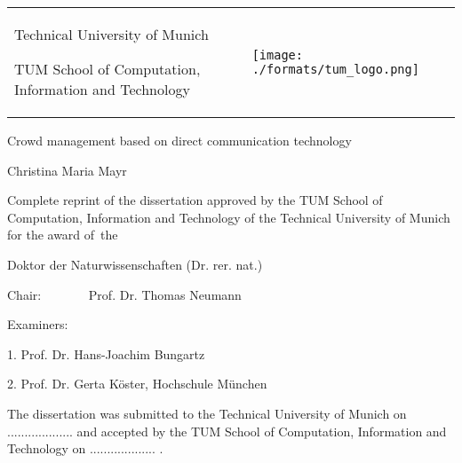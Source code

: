 \begin{titlepage}





\begin{tabular}{p{13cm}p{4cm}}
{
Technical University of Munich

TUM School of Computation, Information and Technology \newline
} & \vspace{-0.3cm} \texttt{[image: ./formats/tum\_logo.png]}  \\ 
\end{tabular} 

\vspace{3.0cm}



\begin{center}
 {\Large
Crowd management based on direct communication technology} 



{Christina Maria Mayr}


\end{center}




\vspace{1.9cm}
\begin{spacing}{1.5}
Complete reprint of the dissertation approved by the TUM School of Computation, Information and Technology of the Technical University of Munich for the award of~the
\end{spacing}
\vspace{-0.1cm}
\begin{center}
{Doktor der Naturwissenschaften (Dr. rer. nat.) }
\end{center}

\vspace{-0.1cm}



\vspace{2.7cm}
Chair: ~~~~~~\, Prof. Dr. Thomas Neumann

\vspace{0.5cm}
Examiners:


\hspace{2cm}1. Prof. Dr. Hans-Joachim Bungartz

\hspace{2cm}2. Prof. Dr. Gerta Köster, Hochschule München


\vspace{1cm}
\begin{spacing}{1.5}
The dissertation was submitted to the Technical University of Munich on ...................
and accepted by the TUM School of Computation, Information and Technology on ................... .
\end{spacing}

\end{titlepage}